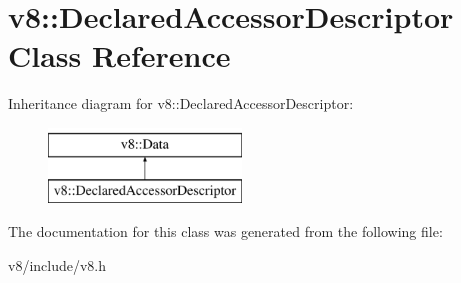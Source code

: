 \hypertarget{classv8_1_1DeclaredAccessorDescriptor}{\section{v8\-:\-:Declared\-Accessor\-Descriptor Class Reference}
\label{classv8_1_1DeclaredAccessorDescriptor}
}
Inheritance diagram for v8\-:\-:Declared\-Accessor\-Descriptor\-:\begin{figure}[H]
\begin{center}
\leavevmode
\includegraphics[height=2.000000cm]{classv8_1_1DeclaredAccessorDescriptor}
\end{center}
\end{figure}


The documentation for this class was generated from the following file\-:\begin{DoxyCompactItemize}
\item 
v8/include/v8.\-h\end{DoxyCompactItemize}

